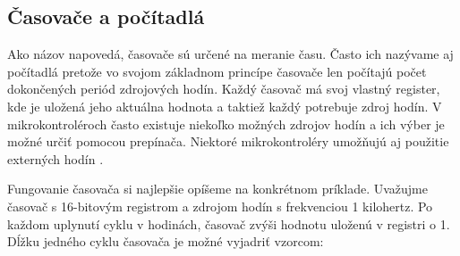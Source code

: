 \subsection{Časovače a počítadlá}
\noindent

Ako názov napovedá, časovače sú určené na meranie času. Často ich nazývame aj počítadlá
pretože vo svojom základnom princípe časovače len počítajú počet dokončených periód zdrojových hodín.
Každý časovač má svoj vlastný register, kde je uložená jeho aktuálna hodnota a taktiež každý potrebuje zdroj hodín. V mikrokontroléroch často existuje niekoľko možných zdrojov
hodín a ich výber je možné určiť pomocou prepínača. Niektoré mikrokontroléry umožňujú aj použitie
externých hodín \cite{IntroductionMicrocontrollerTimers}. \par
Fungovanie časovača si najlepšie opíšeme na konkrétnom príklade.
Uvažujme časovač s 16-bitovým registrom a zdrojom hodín s frekvenciou 1 kilohertz. Po každom uplynutí cyklu v hodinách, časovač
zvýši hodnotu uloženú v registri o 1. Dĺžku jedného cyklu časovača je možné vyjadriť vzorcom:

